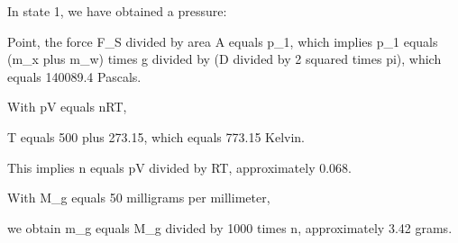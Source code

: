 In state 1, we have obtained a pressure:

Point, the force F_S divided by area A equals p_1, which implies p_1 equals (m_x plus m_w) times g divided by (D divided by 2 squared times pi), which equals 140089.4 Pascals.

With pV equals nRT,

T equals 500 plus 273.15, which equals 773.15 Kelvin.

This implies n equals pV divided by RT, approximately 0.068.

With M_g equals 50 milligrams per millimeter,

we obtain m_g equals M_g divided by 1000 times n, approximately 3.42 grams.